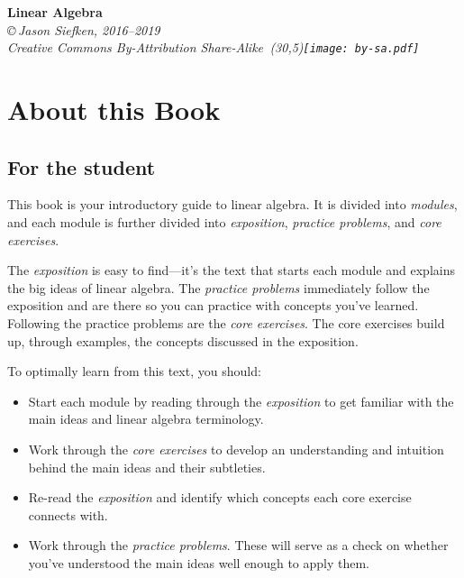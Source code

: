 \begin{center}
	{\color{myorange}\huge\bfseries\sffamily Linear Algebra}\\

\vspace{.2in}
{
\it \copyright\,Jason Siefken, 2016--2019 \\
Creative Commons By-Attribution Share-Alike\, \makebox(30,5){\texttt{[image: by-sa.pdf]}}
}
\end{center}

\section*{About this Book}

\subsection*{For the student}

This book is your introductory guide to linear algebra. It is divided into
\emph{modules}, and each module is further divided into \emph{exposition},
\emph{practice problems}, and \emph{core exercises}.

The \emph{exposition} is easy to find---it's the text that starts each
module and explains the big ideas of linear algebra.  The \emph{practice
problems} immediately follow the exposition and are there so you can
practice with concepts you've learned.  Following the practice problems
are the \emph{core exercises}. The core exercises build up, through
examples, the concepts discussed in the exposition.

To optimally learn from this text, you should:
\begin{itemize}
	\item Start each module by reading through the \emph{exposition} to get familiar with the main ideas and 
		linear algebra terminology.

	\item Work through the \emph{core exercises} to develop an understanding and intuition behind the main ideas
		and their subtleties.

	\item Re-read the \emph{exposition} and identify which concepts each core exercise connects with.

	\item Work through the \emph{practice problems}. These will serve as a check on whether you've understood
		the main ideas well enough to apply them.
\end{itemize}

